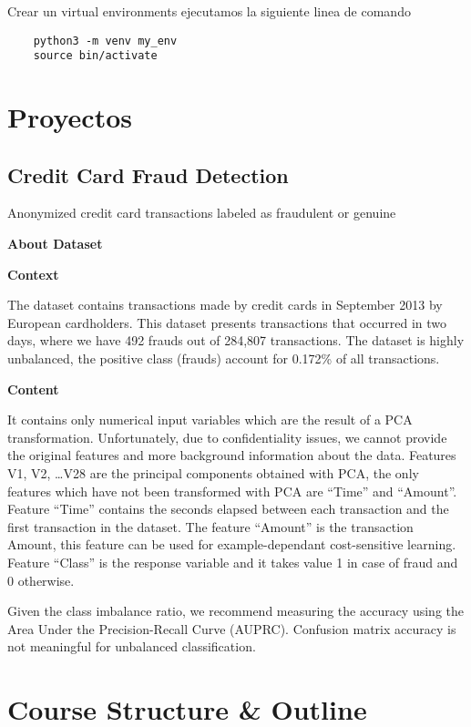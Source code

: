 Crear un virtual environments ejecutamos la siguiente linea de comando

\begin{verbatim}
	python3 -m venv my_env
	source bin/activate
\end{verbatim}




\chapter{Proyectos}

\section{Credit Card Fraud Detection}
Anonymized credit card transactions labeled as fraudulent or genuine

	{\LARGE\bf  About Dataset}


	{\large\bf Context}

The dataset contains transactions made by credit cards in September 2013 by European cardholders.
This dataset presents transactions that occurred in two days, where we have 492 frauds out of 284,807 transactions.
The dataset is highly unbalanced, the positive class (frauds) account for 0.172\% of all transactions.

	{\large\bf Content}

It contains only numerical input variables which are the result of a PCA transformation.
Unfortunately, due to confidentiality issues, we cannot provide the original features and more background information about the data.
Features V1, V2, \ldots V28 are the principal components obtained with PCA, the only features which have not been transformed
with PCA are ``Time'' and ``Amount''. Feature ``Time'' contains the seconds elapsed between each transaction and the first transaction
in the dataset. The feature ``Amount'' is the transaction Amount, this feature can be used for example-dependant cost-sensitive learning.
Feature ``Class'' is the response variable and it takes value 1 in case of fraud and 0 otherwise.

Given the class imbalance ratio, we recommend measuring the accuracy using the Area Under the Precision-Recall Curve (AUPRC).
Confusion matrix accuracy is not meaningful for unbalanced classification.

\chapter{Course Structure \& Outline}


